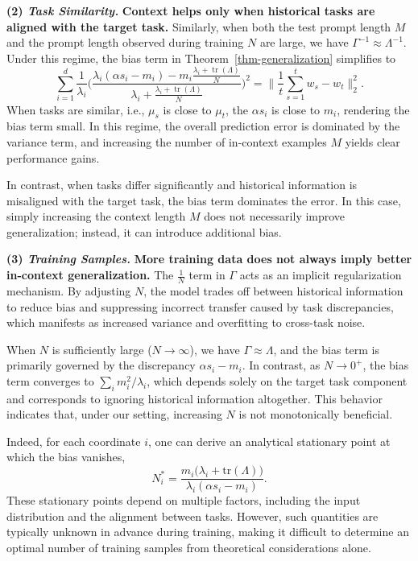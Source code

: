 \documentclass{article}
\theoremstyle{plain}
\theoremstyle{definition}
\theoremstyle{remark}
\begin{document}
\noindent \textbf{(2) \textit{Task Similarity.}} \textbf{Context helps only when historical tasks are aligned with the target task.} Similarly, when both the test prompt length $M$ and the prompt length observed during training $N$ are large, we have $\Gamma^{-1} \approx \Lambda^{-1}$. 
Under this regime, the bias term in Theorem~\ref{thm-generalization} simplifies to
{\small
\begin{equation*}
    \sum_{i=1}^d \frac{1}{\lambda_i}
    \Big(
    \frac{\lambda_i(\alpha s_i - m_i) - m_i\frac{\lambda_i + \operatorname{tr}(\Lambda)}{N}}
         {\lambda_i + \frac{\lambda_i + \operatorname{tr}(\Lambda)}{N}}
    \Big)^2
    = \Big\|\frac{1}{t}\sum_{s=1}^t w_s - w_t\Big\|_2^2 .
\end{equation*}
}
When tasks are similar, i.e., $\mu_s$ is close to $\mu_t$, the $\alpha s_i$ is close to $m_i$, rendering the bias term small. In this regime, the overall prediction error is dominated by the variance term, and increasing the number of in-context examples $M$ yields clear performance gains.

In contrast, when tasks differ significantly and historical information is misaligned with the target task, the bias term dominates the error. In this case, simply increasing the context length $M$ does not necessarily improve generalization; instead, it can introduce additional bias.

\noindent \textbf{(3) \textit{Training Samples.}} \textbf{More training data does not always imply better in-context generalization.}
The $\tfrac{1}{N}$ term in $\Gamma$ acts as an implicit regularization mechanism. 
By adjusting $N$, the model trades off between historical information to reduce bias and suppressing incorrect transfer caused by task discrepancies, which manifests as increased variance and overfitting to cross-task noise.

When $N$ is sufficiently large ($N \to \infty$), we have $\Gamma \approx \Lambda$, and the bias term is primarily governed by the discrepancy $\alpha s_i - m_i$. 
In contrast, as $N \to 0^+$, the bias term converges to $\sum_i m_i^2 / \lambda_i$, which depends solely on the target task component and corresponds to ignoring historical information altogether. 
This behavior indicates that, under our setting, increasing $N$ is not monotonically beneficial.

Indeed, for each coordinate $i$, one can derive an analytical stationary point at which the bias vanishes,
\[
N_i^* = \frac{m_i\big(\lambda_i + \mathrm{tr}(\Lambda)\big)}{\lambda_i(\alpha s_i - m_i)} .
\]
These stationary points depend on multiple factors, including the input distribution and the alignment between tasks. 
However, such quantities are typically unknown in advance during training, making it difficult to determine an optimal number of training samples from theoretical considerations alone.
\end{document}
